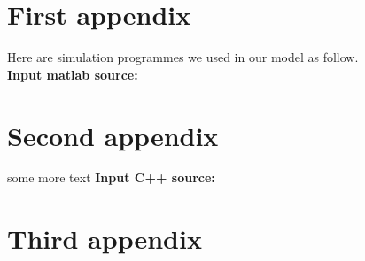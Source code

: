 \section{First appendix}
\lipsum[13]
Here are simulation programmes we used in our model as follow.\\
\textbf{\textcolor[rgb]{0.98,0.00,0.00}{Input matlab source:}}


\section{Second appendix}
some more text \textcolor[rgb]{0.98,0.00,0.00}{\textbf{Input C++ source:}}


\section{Third appendix}
